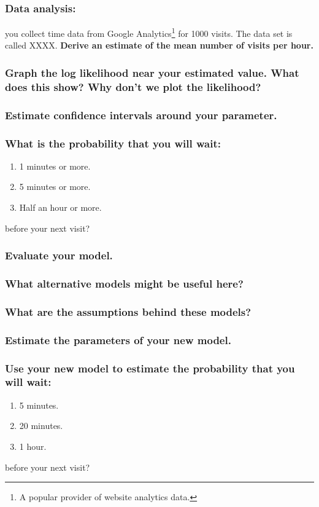 \documentclass[11pt,fullpage]{book}
\begin{document}
\subsubsection{Data analysis:} you collect time data from Google Analytics\footnote{A popular provider of website analytics data.} for 1000 visits. The data set is called XXXX. \textbf{Derive an estimate of the mean number of visits per hour.}
\subsubsection{Graph the log likelihood near your estimated value. What does this show? Why don't we plot the likelihood?}
\subsubsection{Estimate confidence intervals around your parameter.}
\subsubsection{What is the probability that you will wait:}
\begin{enumerate}
\item 1 minutes or more.
\item 5 minutes or more.
\item Half an hour or more.
\end{enumerate}
before your next visit?
\subsubsection{Evaluate your model.}
\subsubsection{What alternative models might be useful here?}
\subsubsection{What are the assumptions behind these models?}
\subsubsection{Estimate the parameters of your new model.}
\subsubsection{Use your new model to estimate the probability that you will wait:}
\begin{enumerate}
\item 5 minutes.
\item 20 minutes.
\item 1 hour.
\end{enumerate}
before your next visit?
\end{document}
